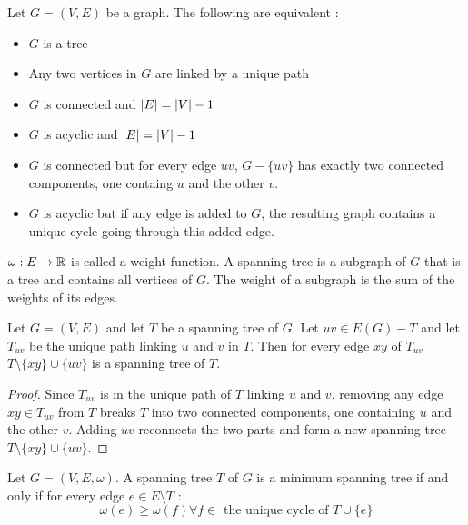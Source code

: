 \documentclass[12pt]{cours}
\begin{document}
\begin{proposition}
    Let $G = (V, E)$ be a graph. The following are equivalent :
    \begin{itemize}
        \item $G$ is a tree
        \item Any two vertices in $G$ are linked by a unique path
        \item $G$ is connected and $\left|E\right| = \left|V\right| - 1$
        \item $G$ is acyclic and $\left|E\right| = \left|V\right| - 1$
        \item $G$ is connected but for every edge $uv$, $G - \{uv\}$ has exactly two connected components, one containg $u$ and the other $v$.
        \item $G$ is acyclic but if any edge is added to $G$, the resulting graph contains a unique cycle going through this added edge.
    \end{itemize}
\end{proposition}

\begin{definition}
    $\omega : E \to \mathbb{R}$ is called a weight function. A spanning tree is a subgraph of $G$ that is a tree and contains all vertices of $G$. The weight of a subgraph is the sum of the weights of its edges.
\end{definition}


\begin{proposition}
    Let $G = (V, E)$ and let $T$ be a spanning tree of $G$. Let $uv \in E(G) - T$ and let $T_{uv}$ be the unique path linking $u$ and $v$ in $T$. Then for every edge $xy$ of $T_{uv}$ $T\setminus \{xy\} \cup \{uv\}$ is a spanning tree of $T$.
\end{proposition}
\begin{proof}
    Since $T_{uv}$ is in the unique path of $T$ linking $u$ and $v$, removing any edge $xy \in T_{uv}$ from $T$ breaks $T$ into two connected components, one containing $u$ and the other $v$. Adding $uv$ reconnects the two parts and form a new spanning tree $T \setminus \{xy\} \cup \{uv\}$.
\end{proof}

\begin{theorem}
    Let $G = \left(V, E, \omega\right)$. A spanning tree $T$ of $G$ is a minimum spanning tree if and only if for every edge $e \in E \setminus T$ :
    \[
        \omega(e) \geq \omega(f) \forall f \in \text{ the unique cycle of } T \cup \{e\}
    \]
\end{theorem}
\end{document}
